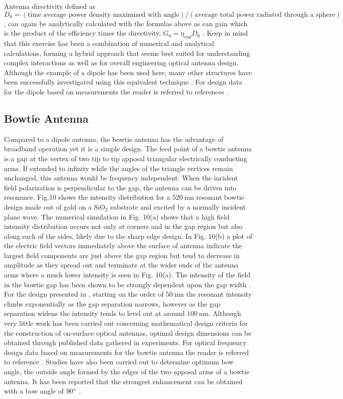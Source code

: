 \documentclass[11pt]{article}
\begin{document}
Antenna directivity defined as $D_0 = (\text{time average power density maximized with angle})/(\text{average total power radiated through a sphere})$, can again be analytically calculated with the formulas above as can gain which is the product of the efficiency times the directivity, $G_0 = \eta_{rad} D_0$ . Keep in mind that this exercise has been a combination of numerical and analytical calculations, forming a hybrid approach that seems best suited for understanding complex interactions as well as for overall engineering optical antenna design.  Although the example of a dipole has been used here, many other structures have been successfully investigated using this equivalent technique \cite{Zhao2011,9781107014145}. For design data for the dipole based on measurements the reader is referred to references \cite{Schuck2005,Fischer2008,Muskens2007}.
\subsection{Bowtie Antenna}
%
Compared to a dipole antenna, the bowtie antenna has the advantage of broadband operation yet it is a simple design. The feed point of a bowtie antenna is a gap at the vertex of two tip to tip apposal triangular electrically conducting arms. If extended to infinity while the angles of the triangle vertices remain unchanged, this antenna would be frequency independent. When the incident field polarization is perpendicular to the gap, the antenna can be driven into resonance. Fig.10 shows the intensity distribution for a $520~\text{nm}$ resonant bowtie design made out of gold on a $\text{SiO}_2$ substrate and excited by a normally incident plane wave. The numerical simulation in Fig. 10(a) shows that a high field intensity distribution occurs not only at corners and in the gap region but also along each of the sides, likely due to the sharp edge design. In Fig. 10(b) a plot of the electric field vectors immediately above the surface of antenna indicate the largest field components are just above the gap region but tend to decrease in amplitude as they spread out and terminate at the wider ends of the antenna arms where a much lower intensity is seen in Fig. 10(a). The intensity of the field in the bowtie gap has been shown
to be strongly dependent upon the gap width \cite{Schuck2005}. For the design presented in \cite{Schuck2005}, starting on the order of $50~\text{nm}$ the resonant intensity climbs exponentially as the gap separation narrows, however as the gap separation widens the intensity tends to level out at around $100~\text{nm}$. Although very little work has been carried out concerning mathematical design criteria for the construction of on-surface optical antennas, optimal design dimensions can be obtained through published data gathered in experiments. For optical frequency design data based on measurements for the bowtie antenna the reader is referred to reference \cite{Fischer2008}. Studies have also been carried out to determine optimum bow angle, the outside angle formed by the edges of the two apposal arms of a bowtie antenna. It has been reported that the strongest enhancement can be obtained with a bow angle of $90 \degree$ \cite{Fischer2008}.
\end{document}
